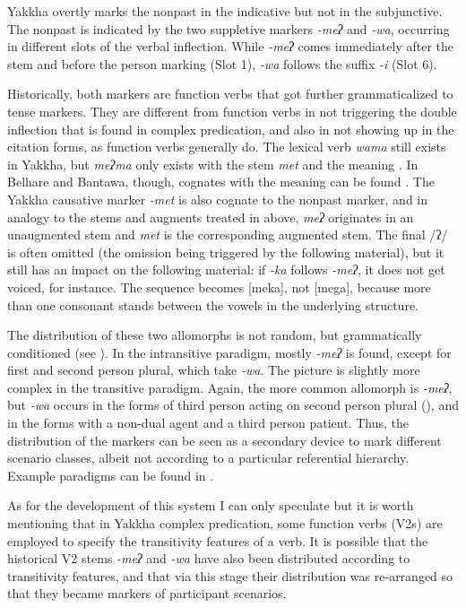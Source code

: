 Yakkha overtly marks the nonpast in the indicative but not in the subjunctive. The nonpast is indicated by the two suppletive markers \emph{-meʔ} and \emph{-wa}, occurring in different slots of the verbal inflection. While  \emph{-meʔ} comes immediately after the stem and before the person marking (Slot 1), \emph{-wa} follows the suffix \emph{-i}  (Slot 6). 

Historically, both markers are function verbs that got further grammaticalized to tense markers. They are different from function verbs in not triggering the double inflection that is found in complex predication, and also in not showing up in the citation forms, as function verbs generally do. The lexical verb \emph{wama}  still exists in Yakkha, but \emph{meʔma} only exists with the stem \emph{met} and the meaning . In Belhare and Bantawa, though, cognates with the meaning  can be found  \citep{Bickel1997Dictionary, Doornenbal2009A-grammar}. The Yakkha causative marker \emph{-met} is also cognate to the nonpast marker, and in analogy to the stems and augments treated in  above,  \emph{meʔ} originates in an unaugmented stem and \emph{met} is the corresponding augmented stem. The final /ʔ/ is often omitted (the omission being triggered by the following material), but it still has an impact on the following material: if \emph{-ka} follows \emph{-meʔ}, it does not get voiced, for instance. The sequence becomes [meka], not [mega], because more than one consonant stands between the vowels  in the underlying structure.


The distribution of these two allomorphs is not random, but grammatically conditioned (see ). In the intransitive paradigm, mostly \emph{-meʔ} is found, except for first and second person plural, which take \emph{-wa}. The picture is slightly more complex in the transitive paradigm. Again, the more common allomorph is \emph{-meʔ}, but \emph{-wa} occurs in the forms of third person acting on second person plural (), and in the forms with a non-dual agent and a third person patient. Thus, the distribution of the markers can be seen as  a secondary device to mark different scenario classes, albeit not according to a particular referential hierarchy.  Example paradigms can be found in . 

As for the development of this system I can only speculate but it is worth mentioning that in Yakkha complex predication, some function verbs (V2s) are employed to specify the transitivity features of a verb. It is possible that the historical V2 stems \emph{-meʔ} and \emph{-wa} have also been distributed according to transitivity features, and that via this stage their distribution was re-arranged so that they became markers of participant scenarios.

